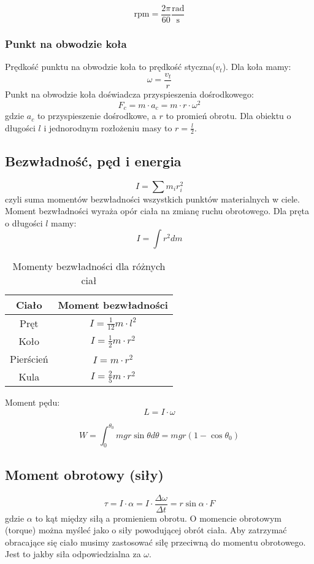 \documentclass{../notatki}
\begin{document}
$$
\text{rpm} = \frac{2\pi}{60} \frac{\text{rad}}{\text{s}}
$$

\subsubsection{Punkt na obwodzie koła}
Prędkość punktu na obwodzie koła to prędkość styczna($v_t$). Dla koła mamy:
$$
\omega = \frac{v_t}{r}
$$
Punkt na obwodzie koła doświadcza przyspieszenia dośrodkowego:
$$
F_c = m \cdot a_c = m \cdot r \cdot \omega^2
$$
gdzie $a_c$ to przyspieszenie dośrodkowe, a $r$ to promień obrotu. Dla obiektu
o długości $l$ i jednorodnym rozłożeniu masy to $r = \frac{l}{2}$.

\subsection{Bezwładność, pęd i energia}

$$
I = \sum m_i r_i^2
$$
czyli suma momentów bezwładności wszystkich punktów materialnych w ciele.
Moment bezwładności wyraża opór ciała na zmianę ruchu obrotowego.
Dla pręta o długości $l$ mamy:
$$
I = \int r^2 dm
$$

\begin{table*}[ht]
  \centering
  \begin{tabular}{c|c}
    Ciało & Moment bezwładności \\ \hline
    Pręt & $I = \frac{1}{12} m \cdot l^2$ \\ \hline
    Koło & $I = \frac{1}{2} m \cdot r^2$ \\ \hline
    Pierścień & $I = m \cdot r^2$ \\ \hline
    Kula & $I = \frac{2}{5} m \cdot r^2$
  \end{tabular}
  \caption{Momenty bezwładności dla różnych ciał}
\end{table*}

Moment pędu:
$$
L = I \cdot \omega
$$

$$
W = \int^{\theta_0}_0 mgr\sin\theta d\theta = mgr(1 - \cos\theta_0)
$$

\subsection{Moment obrotowy (siły)}

$$
\tau = I \cdot \alpha = I \cdot \frac{\Delta \omega}{\Delta t} =
r\sin\alpha \cdot F
$$
gdzie $\alpha$ to kąt między siłą a promieniem obrotu.
O momencie obrotowym (torque) można myśleć jako o siły powodującej obrót
ciała. Aby zatrzymać obracające się ciało musimy zastosować siłę przeciwną
do momentu obrotowego. Jest to jakby siła odpowiedzialna za $\omega$.
\end{document}
